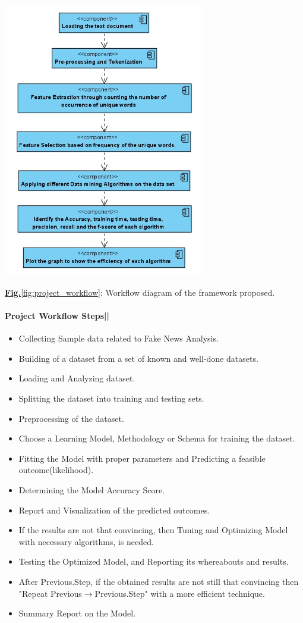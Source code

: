 \documentclass[11.5pt]{article}
\begin{document}
\begin{multicols}{2}
\begin{center}
    \centering
    \includegraphics[width=8.8cm]{Workflow diagram of the framework proposed framework .jpg}
    \caption{\underline{\textbf{Fig.}\ref{fig:project_workflow}}: Workflow diagram of the framework proposed.}
    \label{fig:project_workflow}
\end{center}

\paragraph{Project Workflow Steps||}
\begin{itemize}
    \item Collecting Sample data related to Fake News Analysis.
    \item Building of a dataset from a set of known and well-done datasets.
    \item Loading and Analyzing dataset.
    \item Splitting the dataset into training and testing sets.
    \item Preprocessing of the dataset.
    \item Choose a Learning Model, Methodology or Schema for training the dataset.
    \item Fitting the Model with proper parameters and Predicting a feasible outcome(likelihood). 
    \item Determining the Model Accuracy Score.
    \item Report and Visualization of the predicted outcomes.
    \item If the results are not that convincing, then Tuning and Optimizing Model with necessary algorithms, is needed.
    \item Testing the Optimized Model, and Reporting its whereabouts and results.
    \item After Previous.Step, if the obtained results are not still that convincing then "Repeat Previous$\rightarrow$Previous.Step" with a more efficient technique.
    \item Summary Report on the Model.
\end{itemize}


\end{multicols}
\end{document}
